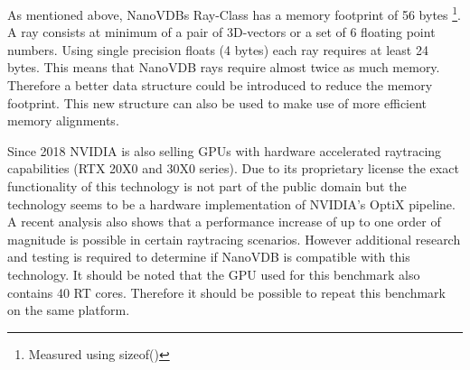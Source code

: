 As mentioned above, NanoVDBs Ray-Class has a memory footprint of 56 bytes \footnote{Measured using sizeof()}.
A ray consists at minimum of a pair of 3D-vectors or a set of 6 floating point numbers.
Using single precision floats (4 bytes) each ray requires at least 24 bytes.
This means that NanoVDB rays require almost twice as much memory.
Therefore a better data structure could be introduced to reduce the memory footprint.
This new structure can also be used to make use of more efficient memory alignments.


Since 2018 NVIDIA is also selling GPUs with hardware accelerated raytracing capabilities (RTX 20X0 and 30X0 series).
Due to its proprietary license the exact functionality of this technology is not part of the public domain but the technology seems to be a hardware implementation of NVIDIA's OptiX pipeline.
A recent analysis \cite{sanzharov2020survey} also shows that a performance increase of up to one order of magnitude is possible in certain raytracing scenarios.
However additional research and testing is required to determine if NanoVDB is compatible with this technology.
It should be noted that the GPU used for this benchmark also contains 40 RT cores.
Therefore it should be possible to repeat this benchmark on the same platform.







